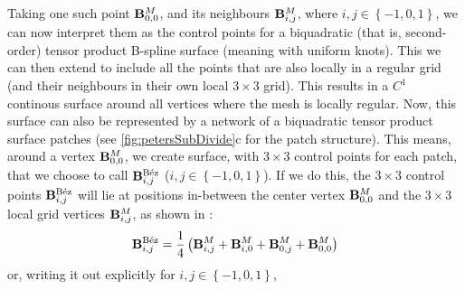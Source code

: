 Taking one such point $\petersLocalPatchPointIndices{0,0}$, and its neighbours $\petersLocalPatchPointIndices{i,j}$, where $i,j \in \left \lbrace-1,0,1\right \rbrace$, we can now interpret them as the control points for a biquadratic (that is, second-order) tensor product B-spline surface (meaning with uniform knots). This we can then extend to include all the points that are also locally in a regular grid (and their neighbours in their own local $3\times3$ grid). This results in a $C^1$ continous surface around all vertices where the mesh is locally regular.
Now, this surface can also be represented by a network of a biquadratic tensor product \Bez surface patches (see \autoref{fig:petersSubDivide}c for the patch structure). This means, around a vertex $\petersLocalPatchPointIndices{0,0}$, we create \Bez surface, with $3\times3$ control points for each patch, that we choose to call $\petersLocalBezPointIndices{i,j}$ ($i,j \in \left \lbrace{-1},0,1\right \rbrace$). If we do this, the $3\times3$ \Bez control points $\petersLocalBezPointIndices{i,j}$ will lie at positions in-between the center vertex $\petersLocalPatchPointIndices{0,0}$ and the $3\times3$ local grid vertices $\petersLocalPatchPointIndices{i,j}$, as shown in \cite{peters1992constructing}:
\begin{equation}
\petersLocalBezPointIndices{i,j} = \frac{1}{4}\left(\petersLocalPatchPointIndices{i,j} + \petersLocalPatchPointIndices{i,0} + \petersLocalPatchPointIndices{0,j} + \petersLocalPatchPointIndices{0,0}\right)
\end{equation}
or, writing it out explicitly for $i,j \in \left \lbrace{-1},0,1\right \rbrace$,

